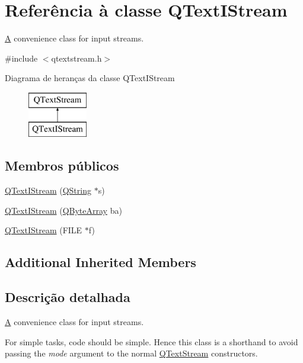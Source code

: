 \hypertarget{class_q_text_i_stream}{\section{Referência à classe Q\-Text\-I\-Stream}
\label{class_q_text_i_stream}
}


\hyperlink{class_a}{A} convenience class for input streams.  




{\ttfamily \#include $<$qtextstream.\-h$>$}

Diagrama de heranças da classe Q\-Text\-I\-Stream\begin{figure}[H]
\begin{center}
\leavevmode
\includegraphics[height=2.000000cm]{class_q_text_i_stream}
\end{center}
\end{figure}
\subsection*{Membros públicos}
\begin{DoxyCompactItemize}
\item 
\hyperlink{class_q_text_i_stream_a61848db52de0eb727273e64c3c24aca3}{Q\-Text\-I\-Stream} (\hyperlink{class_q_string}{Q\-String} $\ast$s)
\item 
\hyperlink{class_q_text_i_stream_ad03bdbc6f8f782dfee03c80d832cd01f}{Q\-Text\-I\-Stream} (\hyperlink{class_q_array}{Q\-Byte\-Array} ba)
\item 
\hyperlink{class_q_text_i_stream_a0bf133e55bf2fa792b497205d8738801}{Q\-Text\-I\-Stream} (F\-I\-L\-E $\ast$f)
\end{DoxyCompactItemize}
\subsection*{Additional Inherited Members}


\subsection{Descrição detalhada}
\hyperlink{class_a}{A} convenience class for input streams. 

For simple tasks, code should be simple. Hence this class is a shorthand to avoid passing the {\itshape mode} argument to the normal \hyperlink{class_q_text_stream}{Q\-Text\-Stream} constructors.

